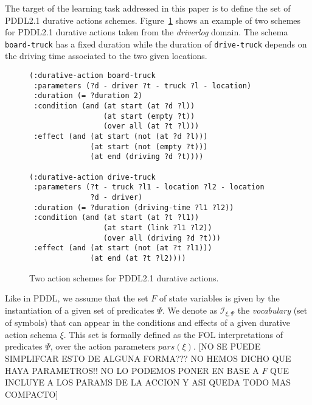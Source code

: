 \documentclass{ecai}
\begin{document}
The target of the learning task addressed in this paper is to define the set of PDDL2.1 durative actions schemes. Figure~\ref{fig:exampleactions2} shows an example of two schemes for PDDL2.1 durative actions taken from the {\em driverlog} domain. The schema \texttt{board-truck} has a fixed duration while the duration of \texttt{drive-truck} depends on the driving time associated to the two given locations.

\begin{figure}
\begin{scriptsize}    
\begin{verbatim}
(:durative-action board-truck
 :parameters (?d - driver ?t - truck ?l - location)
 :duration (= ?duration 2)
 :condition (and (at start (at ?d ?l)) 
                 (at start (empty ?t))
                 (over all (at ?t ?l)))
 :effect (and (at start (not (at ?d ?l))) 
              (at start (not (empty ?t)))
              (at end (driving ?d ?t))))

(:durative-action drive-truck
 :parameters (?t - truck ?l1 - location ?l2 - location 
              ?d - driver)
 :duration (= ?duration (driving-time ?l1 ?l2))
 :condition (and (at start (at ?t ?l1)) 
                 (at start (link ?l1 ?l2))
                 (over all (driving ?d ?t)))
 :effect (and (at start (not (at ?t ?l1))) 
              (at end (at ?t ?l2))))
\end{verbatim}
\end{scriptsize}    
\caption{Two action schemes for PDDL2.1 durative actions.}
\label{fig:exampleactions2}
\end{figure}

Like in PDDL, we assume that the set $F$ of state variables is given by the instantiation of a given set of predicates $\Psi$. We denote as ${\mathcal I}_{\xi,\Psi}$ the {\em vocabulary} (set of symbols) that can appear in the conditions and effects of a given durative action schema $\xi$. This set is formally defined as the FOL interpretations of predicates $\Psi$, over the action parameters $pars(\xi)$. [NO SE PUEDE SIMPLIFCAR ESTO DE ALGUNA FORMA??? NO HEMOS DICHO QUE HAYA PARAMETROS!! NO LO PODEMOS PONER EN BASE A $F$ QUE INCLUYE A LOS PARAMS DE LA ACCION Y ASI QUEDA TODO MAS COMPACTO]
\end{document}
